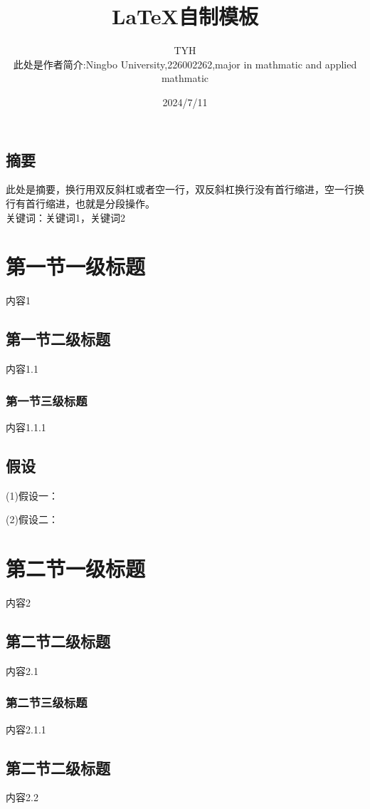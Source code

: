 \documentclass[a4paper,AutoFakeBold]{ctexart} %
\title{\heiti \zihao{2}\LaTeX 自制模板}%
\author{\kaishu \zihao{-4}TYH\\ \songti \zihao{-5} 此处是作者简介:Ningbo University,226002262,major in mathmatic and applied mathmatic}%
\date{2024/7/11}%
\begin{document}
\maketitle%
\vspace{-10pt}%
\newpage
\begin{center}
	\tableofcontents%
\end{center}
\newpage
\begin{center}
	\section*{摘要}
\end{center}

此处是摘要，换行用双反斜杠或者空一行，双反斜杠换行没有首行缩进，空一行换行有首行缩进，也就是分段操作。\\
\heiti 关键词：\songti 关键词1，关键词2
\newpage
\section{第一节一级标题}%
\songti {} 内容1%
\subsection{第一节二级标题} \label{第一节二级标题}
内容1.1
\subsubsection{第一节三级标题}
内容1.1.1
\subsection{假设}
(1)假设一：

(2)假设二：
\section{第二节一级标题}
内容2
\subsection{第二节二级标题}
内容2.1
\subsubsection{第二节三级标题}
内容2.1.1
\subsection{第二节二级标题}
内容2.2
\end{document}
